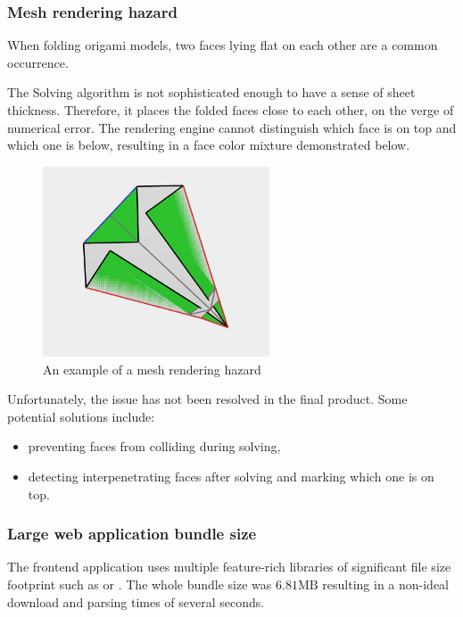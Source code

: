\subsubsection{Mesh rendering hazard}

When folding origami models, two faces lying flat on each other are a common occurrence.

The Solving algorithm is not sophisticated enough to have a sense of sheet thickness. Therefore, it places the folded faces close to each other, on the verge of numerical error. The rendering engine cannot distinguish which face is on top and which one is below, resulting in a face color mixture demonstrated below.

\begin{figure}[H]
	\caption{An example of a mesh rendering hazard}
  \centering
    \includegraphics[width=0.6\textwidth]{assets/3-rendering-hazard.png}
\end{figure}

Unfortunately, the issue has not been resolved in the final product. Some potential solutions include:
\begin{itemize}
	\item preventing faces from colliding during solving,
	\item detecting interpenetrating faces after solving and marking which one is on top.
\end{itemize}

\subsubsection{Large web application bundle size}

The frontend application uses multiple feature-rich libraries of significant file size footprint such as  or . The whole bundle size was $ 6.81\mathrm{MB} $ resulting in a non-ideal download and parsing times of several seconds.

